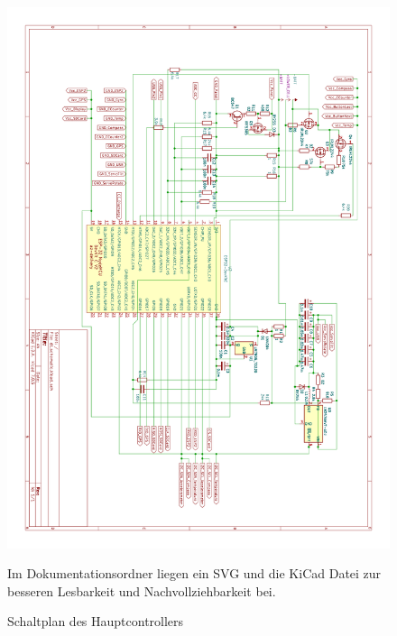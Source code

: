\documentclass[12pt,a4paper,bibliography=totocnumbered,listof=totocnumbered]{article}
\begin{document}
\begin{figure}[htpb] %
    \begin{center}
        \includegraphics[width=15cm,keepaspectratio=true]{pics/hauptespSchaltung_svg-raw.png}
        \caption{Schaltplan des Hauptcontrollers}
        \label{schaltplanHaupt}
    \end{center}
    Im Dokumentationsordner liegen ein SVG und die KiCad Datei zur besseren Lesbarkeit und Nachvollziehbarkeit bei.
\end{figure}
\clearpage
\end{document}
